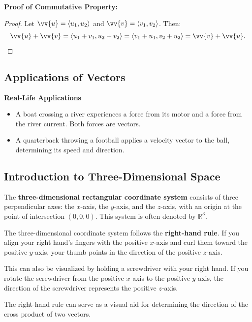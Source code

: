 \documentclass{article}
\begin{document}
\begin{proofbox}
    \textbf{Proof of Commutative Property:}
    \begin{proof}
    Let \(\vv{u} = \langle u_1, u_2 \rangle\) and \(\vv{v} = \langle v_1, v_2 \rangle\). Then:
    \[
    \vv{u} + \vv{v} = \langle u_1 + v_1, u_2 + v_2 \rangle = \langle v_1 + u_1, v_2 + u_2 \rangle = \vv{v} + \vv{u}.
    \]
    \end{proof}
\end{proofbox}

\subsection*{Applications of Vectors}

\begin{examplebox}
    \textbf{Real-Life Applications}
    \begin{itemize}
        \item A boat crossing a river experiences a force from its motor and a force from the river current. Both forces are vectors.
        \item A quarterback throwing a football applies a velocity vector to the ball, determining its speed and direction.
    \end{itemize}
\end{examplebox}

\subsection*{Introduction to Three-Dimensional Space}

The \textbf{three-dimensional rectangular coordinate system} consists of three perpendicular axes: the \(x\)-axis, the \(y\)-axis, and the \(z\)-axis, with an origin at the point of intersection \((0, 0, 0)\). This system is often denoted by \(\mathbb{R}^3\).

\begin{tipbox}
    The three-dimensional coordinate system follows the \textbf{right-hand rule}. If you align your right hand’s fingers with the positive \(x\)-axis and curl them toward the positive \(y\)-axis, your thumb points in the direction of the positive \(z\)-axis.
    \begin{remarkbox}
        This can also be visualized by holding a screwdriver with your right hand. If you rotate the screwdriver from the positive \(x\)-axis to the positive \(y\)-axis, the direction of the screwdriver represents the positive \(z\)-axis.
    \end{remarkbox}
    \begin{notebox}
        The right-hand rule can serve as a visual aid for determining the direction of the cross product of two vectors.
    \end{notebox}
\end{tipbox}
\end{document}
